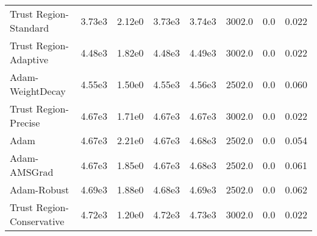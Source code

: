 \documentclass{article}
\begin{document}
\begin{table}[htbp]
{\begin{tabular}{p{2.5cm}*{7}{c}}
Trust Region-Standard & 3.73e3 & 2.12e0 & 3.73e3 & 3.74e3 & 3002.0 & 0.0 & 0.022 \\
Trust Region-Adaptive & 4.48e3 & 1.82e0 & 4.48e3 & 4.49e3 & 3002.0 & 0.0 & 0.022 \\
Adam-WeightDecay & 4.55e3 & 1.50e0 & 4.55e3 & 4.56e3 & 2502.0 & 0.0 & 0.060 \\
Trust Region-Precise & 4.67e3 & 1.71e0 & 4.67e3 & 4.67e3 & 3002.0 & 0.0 & 0.022 \\
Adam & 4.67e3 & 2.21e0 & 4.67e3 & 4.68e3 & 2502.0 & 0.0 & 0.054 \\
Adam-AMSGrad & 4.67e3 & 1.85e0 & 4.67e3 & 4.68e3 & 2502.0 & 0.0 & 0.061 \\
Adam-Robust & 4.69e3 & 1.88e0 & 4.68e3 & 4.69e3 & 2502.0 & 0.0 & 0.062 \\
Trust Region-Conservative & 4.72e3 & 1.20e0 & 4.72e3 & 4.73e3 & 3002.0 & 0.0 & 0.022 \\
\bottomrule
\end{tabular}
}
\end{table}
\end{document}
